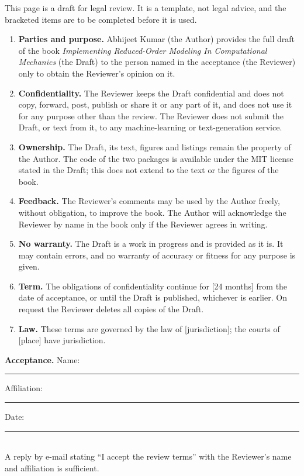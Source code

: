 \newpage\thispagestyle{hl}
\begin{hllimit}\small This page is a draft for legal review. It is a template, not legal advice, and the bracketed items are to be completed before it is used.\end{hllimit}
{\small
\begin{enumerate}\setlength\itemsep{3pt}
\item \textbf{Parties and purpose.} Abhijeet Kumar (the Author) provides the full draft of the book \emph{Implementing Reduced-Order Modeling In Computational Mechanics} (the Draft) to the person named in the acceptance (the Reviewer) only to obtain the Reviewer's opinion on it.
\item \textbf{Confidentiality.} The Reviewer keeps the Draft confidential and does not copy, forward, post, publish or share it or any part of it, and does not use it for any purpose other than the review. The Reviewer does not submit the Draft, or text from it, to any machine-learning or text-generation service.
\item \textbf{Ownership.} The Draft, its text, figures and listings remain the property of the Author. The code of the two packages is available under the MIT license stated in the Draft; this does not extend to the text or the figures of the book.
\item \textbf{Feedback.} The Reviewer's comments may be used by the Author freely, without obligation, to improve the book. The Author will acknowledge the Reviewer by name in the book only if the Reviewer agrees in writing.
\item \textbf{No warranty.} The Draft is a work in progress and is provided as it is. It may contain errors, and no warranty of accuracy or fitness for any purpose is given.
\item \textbf{Term.} The obligations of confidentiality continue for [24 months] from the date of acceptance, or until the Draft is published, whichever is earlier. On request the Reviewer deletes all copies of the Draft.
\item \textbf{Law.} These terms are governed by the law of [jurisdiction]; the courts of [place] have jurisdiction.
\end{enumerate}
\vspace{4pt}\noindent\textbf{Acceptance.} Name: \rule{5cm}{0.3pt}\quad Affiliation: \rule{5cm}{0.3pt}\quad Date: \rule{3cm}{0.3pt}\\[6pt]
A reply by e-mail stating ``I accept the review terms'' with the Reviewer's name and affiliation is sufficient.}
